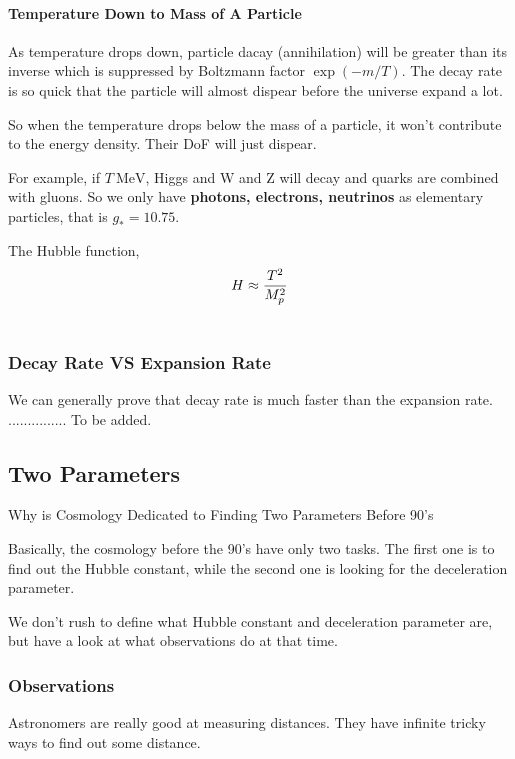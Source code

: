 \documentclass[letterpaper,10pt,english]{sphinxmanual}
\begin{document}
\paragraph{Temperature Down to Mass of A Particle}
\label{Cosmology/cosmoIndex:temperature-down-to-mass-of-a-particle}
As temperature drops down, particle dacay (annihilation) will be greater than its inverse which is suppressed by Boltzmann factor $\exp (-m/T)$. The decay rate is so quick that the particle will almost dispear before the universe expand a lot.

So when the temperature drops below the mass of a particle, it won't contribute to the energy density. Their DoF will just dispear.

For example, if $T~\mathrm{MeV}$, Higgs and W and Z will decay and quarks are combined with gluons. So we only have \textbf{photons, electrons, neutrinos} as elementary particles, that is $g_* = 10.75$.

The Hubble function,
\begin{gather}
\begin{split}H \approx \frac{T^2}{M _ p ^2}\end{split}\notag\\\begin{split}\end{split}\notag
\end{gather}

\subsubsection{Decay Rate VS Expansion Rate}
\label{Cosmology/cosmoIndex:decay-rate-vs-expansion-rate}
We can generally prove that decay rate is much faster than the expansion rate. ............... To be added.


\subsection{Two Parameters}
\label{Cosmology/cosmoIndex:two-parameters}
Why is Cosmology Dedicated to Finding Two Parameters Before 90's

Basically, the cosmology before the 90's have only two tasks. The first one is to find out the Hubble constant, while the second one is looking for the deceleration parameter.

We don't rush to define what Hubble constant and deceleration parameter are, but have a look at what observations do at that time.


\subsubsection{Observations}
\label{Cosmology/cosmoIndex:observations}
Astronomers are really good at measuring distances. They have infinite tricky ways to find out some distance.
\end{document}
